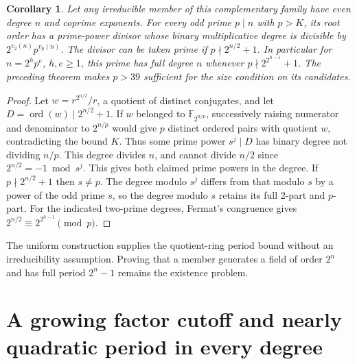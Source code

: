 \documentclass[11pt]{article}
\newtheorem{corollary}[theorem]{Corollary}
\begin{document}
\begin{corollary}\label{cor:local-full-degree-prime}
Let any irreducible member of this complementary family have even
degree \(n\) and coprime exponents. For every odd prime \(p\mid n\)
with \(p>K\), its root order has a prime-power divisor whose
binary multiplicative degree is divisible by
\(2^{v_2(n)}p^{v_p(n)}\). The divisor can be taken prime if
\(p\nmid 2^{n/2}+1\). In particular for \(n=2^h p^e\),
\(h,e\ge1\), this prime has full degree \(n\) whenever
\(p\nmid 2^{2^{h-1}}+1\). The preceding theorem makes \(p>39\)
sufficient for the size condition on its candidates.
\end{corollary}
\begin{proof}
Let \(w=r^{2^{n/2}}/r\), a quotient of distinct conjugates, and
let \(D=\operatorname{ord}(w)\mid 2^{n/2}+1\). If \(w\) belonged
to \(\mathbb F_{2^{n/p}}\), successively raising numerator and
denominator to \(2^{n/p}\) would give \(p\) distinct ordered pairs
with quotient \(w\), contradicting the bound \(K\). Thus some
prime power \(s^j\mid D\) has binary degree not dividing \(n/p\).
This degree divides \(n\), and cannot divide \(n/2\) since
\(2^{n/2}=-1\bmod s^j\). This gives both claimed prime powers
in the degree. If \(p\nmid 2^{n/2}+1\) then \(s\ne p\).
The degree modulo \(s^j\) differs from that modulo \(s\) by
a power of the odd prime \(s\), so the degree modulo \(s\)
retains its full 2-part and \(p\)-part. For the indicated
two-prime degrees, Fermat's congruence gives
\(2^{n/2}\equiv 2^{2^{h-1}}\pmod p\).
\end{proof}

The uniform construction supplies the quotient-ring period bound
without an irreducibility assumption. Proving that a member generates
a field of order \(2^n\) and has full period \(2^n-1\) remains the
existence problem.


\section{A growing factor cutoff and nearly quadratic period in every degree}
\label{sec:uniform-growing-period}
\end{document}
